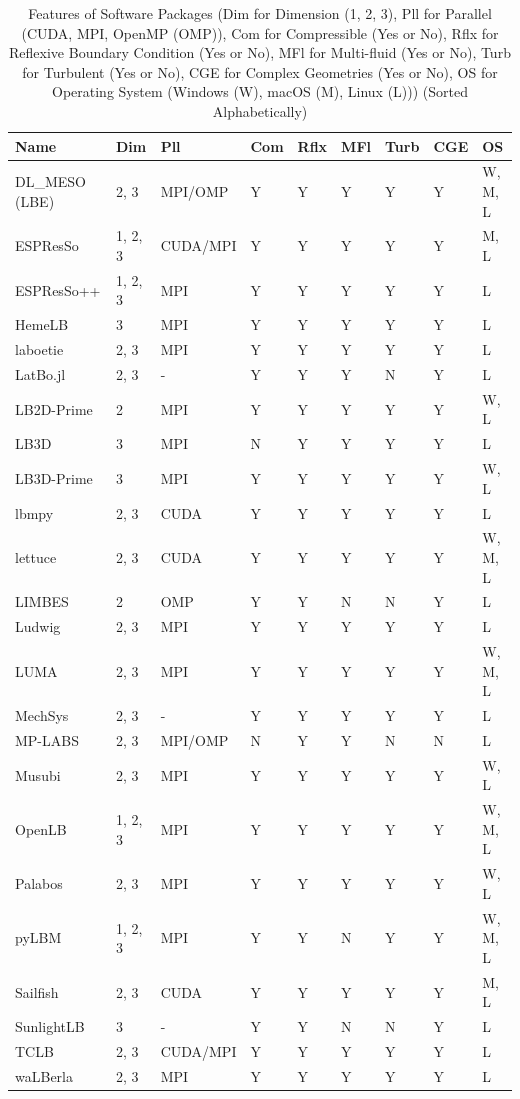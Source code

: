 \documentclass[final, 3p, times, authoryear]{elsarticle}
\begin{document}
\begin{table}[ht!]
	\begin{center}
		\begin{tabular}{ p{3cm}llllllll}
			\toprule
			Name & Dim & Pll & Com & Rflx & MFl & Turb & CGE & OS\\
			\midrule
			DL\_MESO (LBE) & 2, 3 & MPI/OMP & Y & Y & Y & Y & Y & W, M, L\\
			ESPResSo & 1, 2, 3 & CUDA/MPI & Y & Y & Y & Y & Y & M, L\\
			ESPResSo++ & 1, 2, 3 & MPI & Y & Y & Y & Y & Y & L\\
			HemeLB & 3 & MPI & Y & Y & Y & Y & Y & L\\
			laboetie & 2, 3 & MPI & Y & Y & Y & Y & Y & L\\
			LatBo.jl & 2, 3 & - & Y & Y & Y & N & Y & L\\
			LB2D-Prime & 2 & MPI & Y & Y & Y & Y & Y & W, L\\
			LB3D & 3 & MPI & N & Y & Y & Y & Y & L\\
			LB3D-Prime & 3 & MPI & Y & Y & Y & Y & Y & W, L\\
			lbmpy & 2, 3 & CUDA & Y & Y & Y & Y & Y & L\\
			lettuce & 2, 3 & CUDA & Y & Y & Y & Y & Y & W, M, L\\
			LIMBES & 2 & OMP & Y & Y & N & N & Y & L\\
			Ludwig & 2, 3 & MPI & Y & Y & Y & Y & Y & L\\
			LUMA & 2, 3 & MPI & Y & Y & Y & Y & Y & W, M, L\\
			MechSys & 2, 3 & - & Y & Y & Y & Y & Y & L\\
			MP-LABS & 2, 3 & MPI/OMP & N & Y & Y & N & N & L\\
			Musubi & 2, 3 & MPI & Y & Y & Y & Y & Y & W, L\\
			OpenLB & 1, 2, 3 & MPI & Y & Y & Y & Y & Y & W, M, L\\
			Palabos & 2, 3 & MPI & Y & Y & Y & Y & Y & W, L\\
			pyLBM & 1, 2, 3 & MPI & Y & Y & N & Y & Y & W, M, L\\
			Sailfish & 2, 3 & CUDA & Y & Y & Y & Y & Y & M, L\\
			SunlightLB & 3 & - & Y & Y & N & N & Y & L\\
			TCLB & 2, 3 & CUDA/MPI & Y & Y & Y & Y & Y & L\\
			waLBerla & 2, 3 & MPI & Y & Y & Y & Y & Y & L\\
			\bottomrule
		\end{tabular}
		\caption{Features of Software Packages (Dim for Dimension (1, 2, 3), Pll
			for Parallel (CUDA, MPI, OpenMP (OMP)), Com for Compressible (Yes or
			No), Rflx for Reflexive Boundary Condition (Yes or No), MFl for
			Multi-fluid (Yes or No), Turb for Turbulent (Yes or No), CGE for
			Complex Geometries (Yes or No), OS for Operating System (Windows
			(W), macOS (M), Linux (L))) (Sorted Alphabetically)} \label{tbl_features}
	\end{center}
\end{table}
\end{document}

